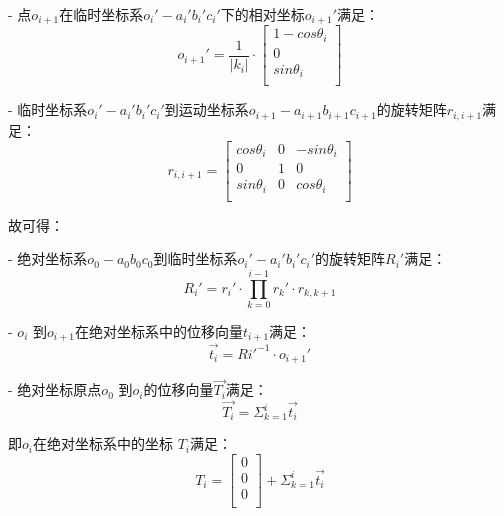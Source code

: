 - 点$o_{i+1}$在临时坐标系$o_i'-a_i'b_i'c_i'$下的相对坐标$o_{i+1}'$满足：
    \begin{equation}
    o_{i+1}' = \frac{1}{|k_i|} \cdot \left[
      \begin{matrix}
    	1 - cos\theta_i\\
    	0 \\
      sin\theta_i\\
      \end{matrix}
    \right]
    \end{equation}
    
- 临时坐标系$o_i'-a_i'b_i'c_i'$到运动坐标系$o_{i+1}-a_{i+1}b_{i+1}c_{i+1}$的旋转矩阵$r_{i, i+1}$满足：
    \begin{equation}
    r_{i, i+1} = \left[
      \begin{matrix}
      cos \theta_i & 0 & -sin \theta_i\\
      0 &1 & 0\\
      sin \theta_i & 0 & cos \theta_i\\
      \end{matrix}
    \right]
    \end{equation}

故可得：

- 绝对坐标系$o_0-a_0b_0c_0$到临时坐标系$o_i'-a_i'b_i'c_i'$的旋转矩阵$R_i'$满足：
    \begin{equation}
    R_i' = r_i' \cdot \prod_{k = 0}^{i-1} r_k' \cdot r_{k, k+1}
    \end{equation}
    
- $o_i$ 到$o_{i+1}$在绝对坐标系中的位移向量$t_{i+1}$满足：
    \begin{equation}
    \vec{t_i} = Ri'^{-1}\cdot o_{i+1}'
    \end{equation}

- 绝对坐标原点$o_0$ 到$o_i$的位移向量$\vec{T_i}$满足：
    \begin{equation}
    \vec{T_i} = \Sigma_{k=1} ^ {i} \vec{t_i}
    \end{equation}

即$o_i$在绝对坐标系中的坐标 $T_i$满足\cite{用于光纤光栅曲线重建算法的坐标点拟合}：
\begin{equation}
T_i = \left[
    \begin{matrix}
    0\\
    0\\
    0\\
  	\end{matrix}
  \right]
  + \Sigma_{k=1} ^ {i} \vec{t_i}
\end{equation}


